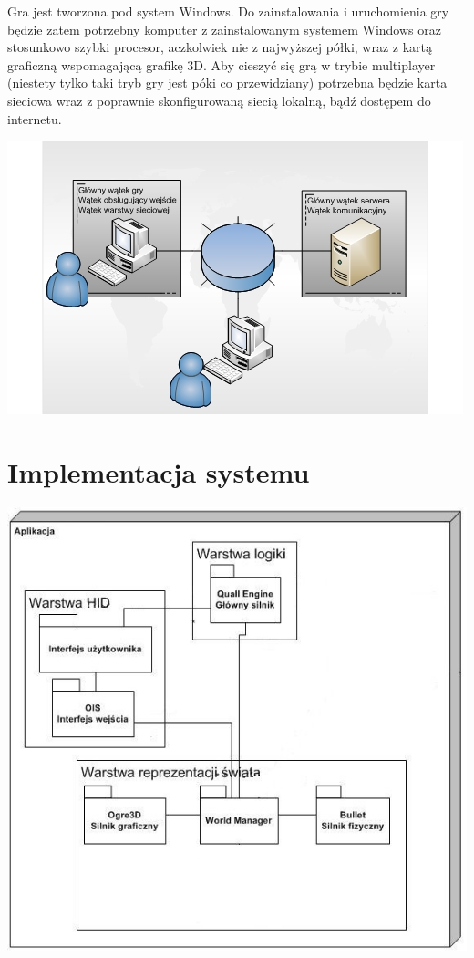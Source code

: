 \documentclass[12pt,a4paper,twoside]{article}
\begin{document}
Gra jest tworzona pod system Windows. Do zainstalowania i uruchomienia gry będzie zatem potrzebny komputer z zainstalowanym systemem Windows oraz stosunkowo szybki procesor, aczkolwiek nie z najwyższej półki, wraz z kartą graficzną wspomagającą grafikę 3D. Aby cieszyć się grą w trybie multiplayer (niestety tylko taki tryb gry jest póki co przewidziany) potrzebna będzie karta sieciowa wraz z poprawnie skonfigurowaną siecią lokalną, bądź dostępem do internetu.

\includegraphics{pics/physicalNodes.jpg}

\section{Implementacja systemu}


\includegraphics{pics/ModuleCommunication.jpg}
\end{document}
